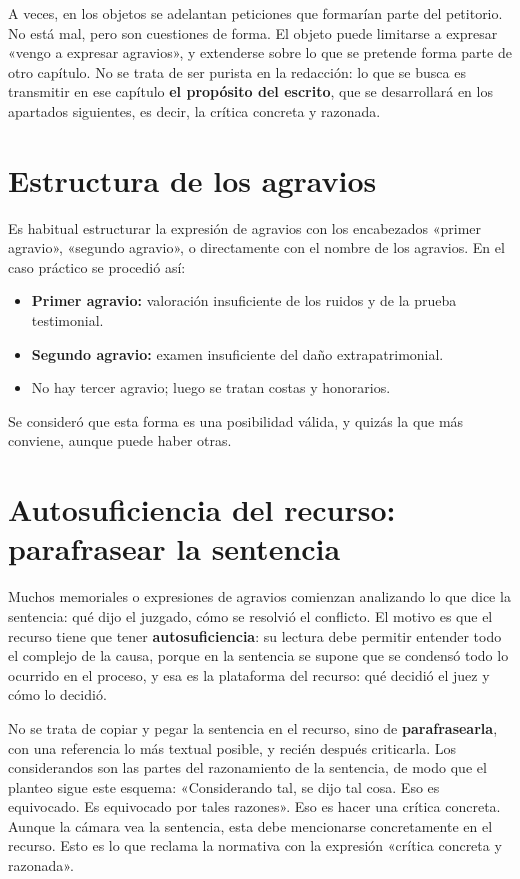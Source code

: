 \documentclass[12pt,oneside]{book}
\begin{document}
A veces, en los objetos se adelantan peticiones que formarían parte del petitorio. No está mal, pero son cuestiones de forma. El objeto puede limitarse a expresar «vengo a expresar agravios», y extenderse sobre lo que se pretende forma parte de otro capítulo. No se trata de ser purista en la redacción: lo que se busca es transmitir en ese capítulo \textbf{el propósito del escrito}, que se desarrollará en los apartados siguientes, es decir, la crítica concreta y razonada.

\section{Estructura de los agravios}

Es habitual estructurar la expresión de agravios con los encabezados «primer agravio», «segundo agravio», o directamente con el nombre de los agravios. En el caso práctico se procedió así:

\begin{itemize}
    \item \textbf{Primer agravio:} valoración insuficiente de los ruidos y de la prueba testimonial.
    \item \textbf{Segundo agravio:} examen insuficiente del daño extrapatrimonial.
    \item No hay tercer agravio; luego se tratan costas y honorarios.
\end{itemize}

Se consideró que esta forma es una posibilidad válida, y quizás la que más conviene, aunque puede haber otras.

\section{Autosuficiencia del recurso: parafrasear la sentencia}

Muchos memoriales o expresiones de agravios comienzan analizando lo que dice la sentencia: qué dijo el juzgado, cómo se resolvió el conflicto. El motivo es que el recurso tiene que tener \textbf{autosuficiencia}: su lectura debe permitir entender todo el complejo de la causa, porque en la sentencia se supone que se condensó todo lo ocurrido en el proceso, y esa es la plataforma del recurso: qué decidió el juez y cómo lo decidió.

No se trata de copiar y pegar la sentencia en el recurso, sino de \textbf{parafrasearla}, con una referencia lo más textual posible, y recién después criticarla. Los considerandos son las partes del razonamiento de la sentencia, de modo que el planteo sigue este esquema: «Considerando tal, se dijo tal cosa. Eso es equivocado. Es equivocado por tales razones». Eso es hacer una crítica concreta. Aunque la cámara vea la sentencia, esta debe mencionarse concretamente en el recurso. Esto es lo que reclama la normativa con la expresión «crítica concreta y razonada».
\end{document}

